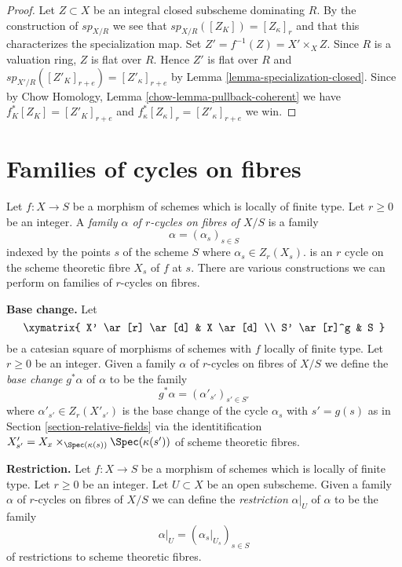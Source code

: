 \begin{proof}
Let $Z \subset X$ be an integral closed subscheme dominating $R$.
By the construction of $sp_{X/R}$ we see that $sp_{X/R}([Z_K]) = [Z_\kappa]_r$
and that this characterizes the specialization map.
Set $Z' = f^{-1}(Z) = X' \times_X Z$.
Since $R$ is a valuation ring, $Z$ is flat over $R$.
Hence $Z'$ is flat over $R$ and
$sp_{X'/R}([Z'_K]_{r + e}) = [Z'_\kappa]_{r + e}$
by Lemma \ref{lemma-specialization-closed}.
Since by Chow Homology, Lemma \ref{chow-lemma-pullback-coherent}
we have $f_K^*[Z_K] = [Z'_K]_{r + e}$ and
$f_\kappa^*[Z_\kappa]_r = [Z'_\kappa]_{r + e}$ we win.
\end{proof}










\section{Families of cycles on fibres}
\label{section-cycles-fibres}

\noindent
Let $f : X \to S$ be a morphism of schemes which is locally of finite type.
Let $r \geq 0$ be an integer. A
{\it family $\alpha$ of $r$-cycles on fibres of $X/S$} is a family
$$
\alpha = (\alpha_s)_{s \in S}
$$
indexed by the points $s$ of the scheme $S$ where
$\alpha_s \in Z_r(X_s)$.
is an $r$ cycle on the scheme theoretic fibre $X_s$ of $f$ at $s$.
There are various constructions we can perform on families of
$r$-cycles on fibres.

\medskip\noindent
{\bf Base change.} Let
$$
\xymatrix{
X' \ar[r] \ar[d] & X \ar[d] \\
S' \ar[r]^g & S
}
$$
be a catesian square of morphisms of schemes with $f$ locally of finite type.
Let $r \geq 0$ be an integer. Given a family $\alpha$ of $r$-cycles on
fibres of $X/S$ we define the {\it base change} $g^*\alpha$ of $\alpha$
to be the family
$$
g^*\alpha = (\alpha'_{s'})_{s' \in S'}
$$
where $\alpha'_{s'} \in Z_r(X'_{s'})$ is the base change
of the cycle $\alpha_s$ with $s' = g(s)$ as in
Section \ref{section-relative-fields} via the identitification
$X'_{s'} = X_x \times_{\Spec(\kappa(s))} \Spec(\kappa(s'))$
of scheme theoretic fibres.

\medskip\noindent
{\bf Restriction.} Let $f : X \to S$ be a morphism of schemes which is locally
of finite type. Let $r \geq 0$ be an integer. Let $U \subset X$ be an open
subscheme. Given a family $\alpha$ of $r$-cycles on fibres of $X/S$
we can define the {\it restriction} $\alpha|_U$ of $\alpha$ to be the family
$$
\alpha|_U = (\alpha_s|_{U_s})_{s \in S}
$$
of restrictions to scheme theoretic fibres.

